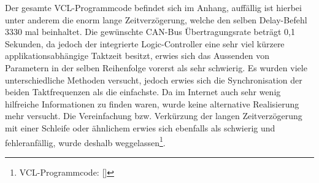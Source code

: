 Der gesamte VCL-Programmcode befindet sich im Anhang, auffällig ist hierbei unter anderem die enorm lange Zeitverzögerung, welche den selben Delay-Befehl 3330 mal beinhaltet. Die gewünschte CAN-Bus Übertragungsrate beträgt 0,1 Sekunden, da jedoch der integrierte Logic-Controller eine sehr viel kürzere applikationsabhängige Taktzeit besitzt, erwies sich das Aussenden von Parametern in der selben Reihenfolge vorerst als sehr schwierig. Es wurden viele unterschiedliche Methoden versucht, jedoch erwies sich die Synchronisation der beiden Taktfrequenzen als die einfachste. Da im Internet auch sehr wenig hilfreiche Informationen zu finden waren, wurde keine alternative Realisierung mehr versucht. Die Vereinfachung bzw. Verkürzung der langen Zeitverzögerung mit einer Schleife oder ähnlichem erwies sich ebenfalls als schwierig und fehleranfällig, wurde deshalb weggelassen\footnote{VCL-Programmcode: [\cite{VCL_Programmcode}]}.

\newpage

